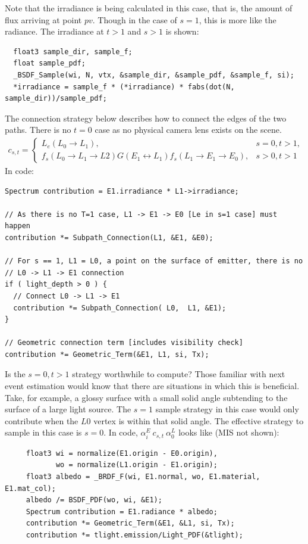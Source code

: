 \documentclass{article}
\begin{document}
  Note that the irradiance is being calculated in this case, that is, the amount
  of flux arriving at point $pv$. Though in the case of $s=1$, this is more like
  the radiance. The irradiance at $t > 1$ and $s > 1$ is shown:

\begin{lstlisting}
  float3 sample_dir, sample_f;
  float sample_pdf;
  _BSDF_Sample(wi, N, vtx, &sample_dir, &sample_pdf, &sample_f, si);
  *irradiance = sample_f * (*irradiance) * fabs(dot(N, sample_dir))/sample_pdf;
\end{lstlisting}
  



  The connection strategy below describes how to connect the edges of the two
paths. There is no $t = 0$ case as no physical camera lens exists on the scene.
  \begin{align}
    c_{s, t} =
    \begin{cases}
      L_e(L_0 \rightarrow L_1), &s = 0, t > 1,\\
      f_s(L_0 \rightarrow L_1 \rightarrow L2) G(E_1 \leftrightarrow
      L_1) f_s(L_1 \rightarrow E_1 \rightarrow E_0), &s > 0, t > 1
    \end{cases}
  \end{align}
  In code:
  \begin{lstlisting}
Spectrum contribution = E1.irradiance * L1->irradiance;

// As there is no T=1 case, L1 -> E1 -> E0 [Le in s=1 case] must happen
contribution *= Subpath_Connection(L1, &E1, &E0);

// For s == 1, L1 = L0, a point on the surface of emitter, there is no
// L0 -> L1 -> E1 connection
if ( light_depth > 0 ) {
  // Connect L0 -> L1 -> E1
  contribution *= Subpath_Connection( L0,  L1, &E1);
}

// Geometric connection term [includes visibility check]
contribution *= Geometric_Term(&E1, L1, si, Tx);

  \end{lstlisting}


  
    Is the $s = 0, t > 1$ strategy worthwhile to compute? Those familiar with
next event estimation would know that there are situations in which this is
beneficial. Take, for example, a glossy surface with a small solid angle
subtending to the surface of a large light source. The $s=1$ sample strategy in
this case would only contribute when the $L0$ vertex is within that solid angle.
The effective strategy to sample in this case is $s = 0$. In code,
$\alpha_i^E\:c_{s,t}\:\alpha_0^L$ looks like (MIS not shown):
    \begin{lstlisting}
     float3 wi = normalize(E1.origin - E0.origin),
            wo = normalize(L1.origin - E1.origin);
     float3 albedo = _BRDF_F(wi, E1.normal, wo, E1.material, E1.mat_col);
     albedo /= BSDF_PDF(wo, wi, &E1);
     Spectrum contribution = E1.radiance * albedo;
     contribution *= Geometric_Term(&E1, &L1, si, Tx);
     contribution *= tlight.emission/Light_PDF(&tlight);
    \end{lstlisting}
    
\end{document}
